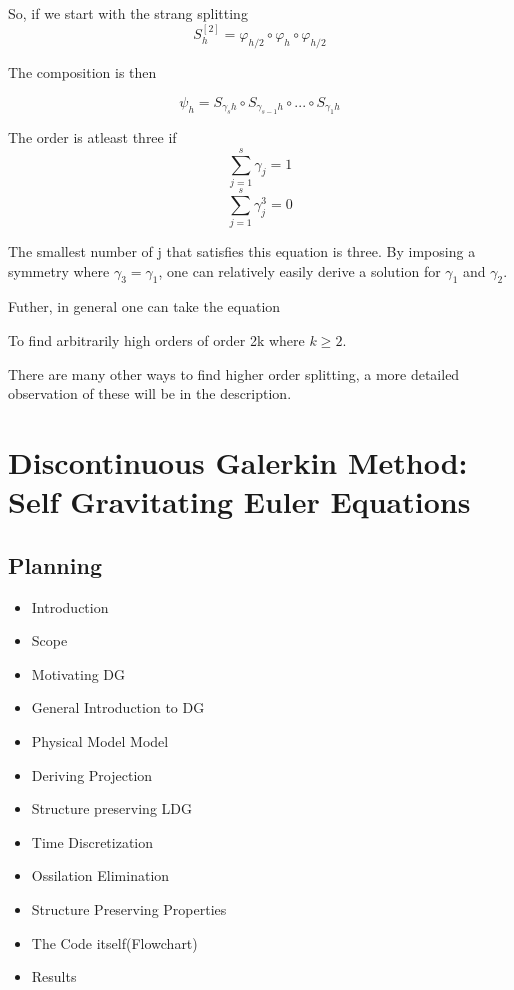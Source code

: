 So, if we start with the strang splitting
\[
	S^{[2]}_h = \varphi_{h/2} \circ \varphi_{h} \circ \varphi_{h/2}
\]

The composition is then

\[
	\psi_h = S_{\gamma_s h} \circ S_{\gamma_{s-1} h} \circ ... \circ S_{\gamma_1 h}
\]

The order is atleast three if
\[
	\sum^s_{j=1} \gamma_j = 1
\]
\[
	\sum^s_{j=1} \gamma_j^3 = 0
\]

The smallest number of j that satisfies this equation is three. By imposing a symmetry where $\gamma_3 = \gamma_1$, one can relatively easily derive a solution for $\gamma_1$ and $\gamma_2$.

Futher, in general one can take the equation

To find arbitrarily high orders of order 2k where $k \geq 2$.

There are many other ways to find higher order splitting, a more detailed observation of these will be in the description.



\section{Discontinuous Galerkin Method: Self Gravitating Euler Equations}
\subsection{Planning}
\begin{itemize}
	\item Introduction
	\item Scope
	\item Motivating DG
	\item General Introduction to DG
	\item Physical Model Model
	\item Deriving Projection
	\item Structure preserving LDG
	\item Time Discretization
	\item Ossilation Elimination
	\item Structure Preserving Properties
	\item The Code itself(Flowchart)
	\item Results
\end{itemize}
